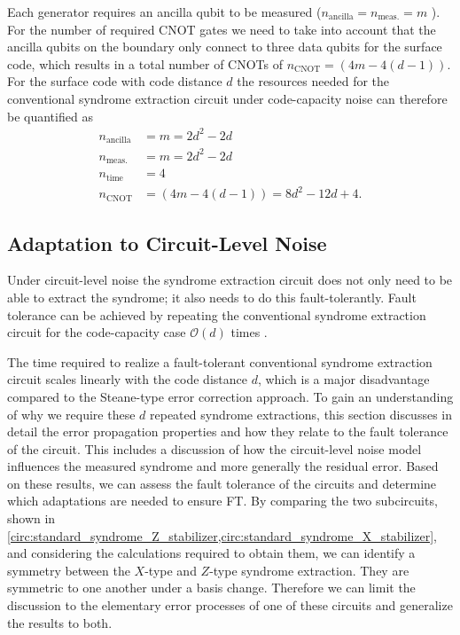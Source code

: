 Each generator requires an ancilla qubit to be measured ($n_{\text{ancilla}}= n_{\text{meas.}} = m $ ).
For the number of required CNOT gates we need to take into account that the ancilla qubits on the boundary only connect to three data qubits for the surface code, 
which results in a total number of CNOTs of $n_{\text{CNOT}} = (4m - 4(d-1))$.
For the surface code with code distance $d$ 
the resources needed for the conventional syndrome extraction circuit under code-capacity noise can therefore be quantified as
\begin{align}
    n_{\text{ancilla}} &= m = 2d^2 -2d \label{eq:resources_conv_se_code_capacity_n_ancillas}\\
    n_{\text{meas.}} &=  m = 2d^2 -2d \\
    n_{\text{time}} &= 4 \\
    n_{\text{CNOT}} &= (4m - 4(d-1)) = 8d^2 - 12 d +4.
\end{align}

\subsection{Adaptation to Circuit-Level Noise}\label{ssec:conv_se_circ_lvl_noise_adaption}

Under circuit-level noise the syndrome extraction circuit does not only need to be able to extract the syndrome; it also needs to do this fault-tolerantly. 
Fault tolerance can be achieved by repeating the conventional syndrome extraction circuit for the code-capacity case $\mathcal{O}(d)$ times \cite{mwpm_threshold_paper}.

The time required to realize a fault-tolerant conventional syndrome extraction circuit scales linearly with the code distance $d$, 
which is a major disadvantage compared to the Steane-type error correction approach.
To gain an understanding of why we require these $d$ repeated syndrome extractions,
this section discusses in detail the error propagation properties and how they relate to the fault tolerance of the circuit. 
This includes a discussion of how the circuit-level noise model influences the measured syndrome and more generally the residual error.
Based on these results, we can assess the fault tolerance of the circuits and determine which adaptations are needed to ensure FT.
By comparing the two subcircuits, shown in \cref{circ:standard_syndrome_Z_stabilizer,circ:standard_syndrome_X_stabilizer}, 
and considering the calculations required to obtain them,
we can identify a symmetry between the $X$-type and $Z$-type syndrome extraction. 
They are symmetric to one another under a basis change.
Therefore we can limit the discussion to the elementary error processes of one of these circuits and generalize the results to both.

